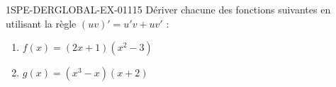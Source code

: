 \begin{exercice}{1SPE-DERGLOBAL-EX-011}{1}{5}
Dériver chacune des fonctions suivantes en utilisant la règle $(uv)' = u'v + uv'$ :
\begin{enumerate}
  \item $f(x) = (2x+1)(x^2-3)$
  \item $g(x) = (x^3-x)(x+2)$
\end{enumerate}
\end{exercice}
